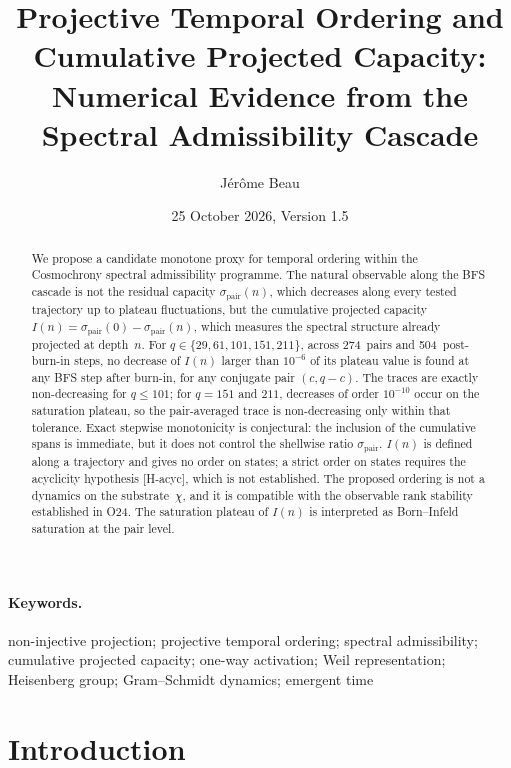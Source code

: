 \documentclass[11pt,a4paper]{article}
\title{Projective Temporal Ordering and Cumulative Projected Capacity:\\
Numerical Evidence from the Spectral Admissibility Cascade}
\author{J\'er\^ome Beau}
\date{25 October 2026, Version 1.5}
\begin{document}
  \maketitle


  \begin{abstract}
    We propose a candidate monotone proxy for temporal ordering within the
    Cosmochrony spectral admissibility programme.
    The natural observable along the BFS cascade is not the residual
    capacity $\sigma_{\mathrm{pair}}(n)$, which decreases along every tested trajectory up to plateau fluctuations,
    but the cumulative projected capacity
    $I(n) = \sigma_{\mathrm{pair}}(0) - \sigma_{\mathrm{pair}}(n)$,
    which measures the spectral structure already projected at depth~$n$.
    For $q \in \{29, 61, 101, 151, 211\}$, across 274~pairs and 504~post-burn-in steps, no
    decrease of $I(n)$ larger than $10^{-6}$ of its plateau value is found at any BFS step after
    burn-in, for any conjugate pair $(c, q{-}c)$.
    The traces are exactly non-decreasing for $q \leq 101$; for $q = 151$ and $211$, decreases of
    order $10^{-10}$ occur on the saturation plateau, so the pair-averaged trace is non-decreasing
    only within that tolerance.
    Exact stepwise monotonicity is conjectural: the inclusion of the cumulative spans is immediate,
    but it does not control the shellwise ratio $\sigma_{\mathrm{pair}}$.
    $I(n)$ is defined along a trajectory and gives no order on states; a strict order on states
    requires the acyclicity hypothesis [H-acyc], which is not established.
    The proposed ordering is not a dynamics on the substrate~$\chi$, and it is
    compatible with the observable rank stability established in O24.
    The saturation plateau of $I(n)$ is interpreted as Born--Infeld
    saturation at the pair level.
  \end{abstract}

  \paragraph{Keywords.}
    non-injective projection; projective temporal ordering; spectral admissibility; cumulative projected
    capacity; one-way activation; Weil representation; Heisenberg group; Gram--Schmidt dynamics; emergent time

    \clearpage

  \section{Introduction}
\end{document}
